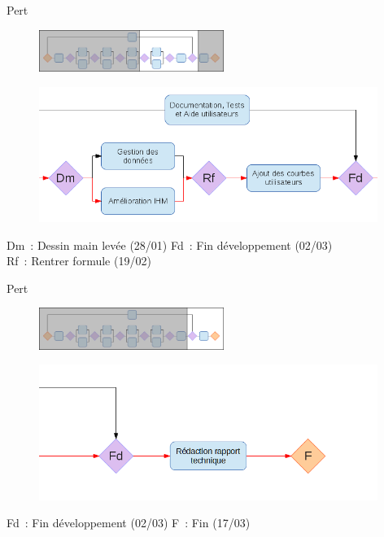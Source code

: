 \documentclass{beamer}
\begin{document}
	\begin{frame}{Pert}
		\begin{figure}
			\includegraphics[width=6cm]
				{../Lancement/ImagesLancement/miniature3.png}
		\end{figure}
		\begin{figure}
			\includegraphics[width=11cm]
				{../Lancement/ImagesLancement/pert_part_3.png}
		\end{figure}
		\footnotesize{Dm~: Dessin main lev\'ee (28/01) \hfill Fd~: Fin 
			d\'eveloppement (02/03)\\
			\hfill Rf~: Rentrer formule (19/02)\hspace*{\fill}}
	\end{frame}

	\begin{frame}{Pert}
		\begin{figure}
			\includegraphics[width=6cm]
				{../Lancement/ImagesLancement/miniature4.png}
		\end{figure}
		\begin{figure}
			\includegraphics[width=11cm]
				{../Lancement/ImagesLancement/pert_part_4.png}
		\end{figure}
		\footnotesize{Fd~: Fin d\'eveloppement (02/03) \hfill F~: Fin (17/03)\\
			[0.48cm]}
	\end{frame}
	
\end{document}
